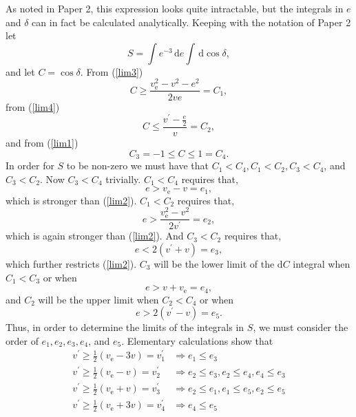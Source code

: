 \documentclass[aps,floatfix,prd,showpacs]{revtex4}
\newcommand{\diff}{\mathrm{d}}
\newcommand{\vesc}{v_{\text{e}}}
\newcommand{\vp}{v^\prime}
\begin{document}
As noted in Paper 2, this expression looks quite intractable, but the integrals in $e$ and $\delta$ can in fact be calculated analytically. Keeping with the notation of Paper 2 let
\begin{equation}
S = \int{e^{-3}}\,\diff e\int{}\,\diff \cos\delta,
\end{equation}
%
and let $C = \cos\delta$. From (\ref{lim3})
\begin{equation}
C \ge \frac{\vesc^2-v^2-e^2}{2ve} = C_1,
\end{equation}
from (\ref{lim4})
\begin{equation}
C \le \frac{\vp - \frac{e}{2}}{v} = C_2,
\end{equation}
and from (\ref{lim1})
\begin{equation}
C_3 = -1 \le C \le 1 = C_4.
\end{equation}
%
%
In order for $S$ to be non-zero we must have that $C_1 < C_4, C_1 < C_2, C_3 < C_4$, and $C_3 < C_2$. Now $C_3 < C_4$ trivially. $C_1 < C_4$ requires that,
%
\begin{equation}
e > \vesc - v = e_1,
\label{e1}
\end{equation}
which is stronger than (\ref{lim2}). $C_1 < C_2$ requires that,
\begin{equation}
e > \frac{\vesc^2 - v^2}{2\vp} = e_2,
\label{e2}
\end{equation}
which is again stronger than (\ref{lim2}). And $C_3 < C_2$ requires that,
\begin{equation}
e < 2(\vp + v) = e_3,
\label{e3}
\end{equation}
which further restricts (\ref{lim2}). $C_3$ will be the lower limit of the $\diff C$ integral when $C_1 < C_3$ or when 
\begin{equation}
e > v + \vesc = e_4,
\end{equation}
and $C_2$ will be the upper limit when $C_2 < C_4$ or when 
\begin{equation}
e > 2(\vp - v) = e_5. 
\end{equation}
%
Thus, in order to determine the limits of the integrals in $S$, we must consider the order of $e_1, e_2, e_3, e_4$, and $e_5$. Elementary calculations show that 
% 
\begin{equation}
\begin{split}
\vp \ge \frac{1}{2}(\vesc - 3v) = \vp_1 &\Rightarrow e_1 \le e_3\\
\vp \ge \frac{1}{2}(\vesc - v) = \vp_2 &\Rightarrow e_2 \le e_3, e_2 \le e_4, e_4 \le e_3\\
\vp \ge \frac{1}{2}(\vesc + v) = \vp_3 &\Rightarrow e_2 \le e_1, e_1 \le e_5, e_2 \le e_5\\
\vp \ge \frac{1}{2}(\vesc + 3v) = \vp_4 &\Rightarrow e_4 \le e_5\\
\end{split}
\end{equation}
\end{document}
